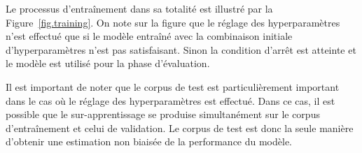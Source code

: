 Le processus d'entraînement dans sa totalité est illustré par la Figure~\ref{fig.training}.
On note sur la figure que le réglage des hyperparamètres n'est effectué 
que si le modèle entraîné avec la combinaison initiale d'hyperparamètres n'est pas satisfaisant.
Sinon la condition d'arrêt est atteinte et le modèle est utilisé pour la phase d'évaluation.

Il est important de noter que le corpus de test est particulièrement important 
dans le cas où le réglage des hyperparamètres est effectué.
Dans ce cas, il est possible que le sur-apprentissage se produise simultanément 
sur le corpus d'entraînement et celui de validation.
Le corpus de test est donc la seule manière d'obtenir une estimation non biaisée de la performance du modèle.